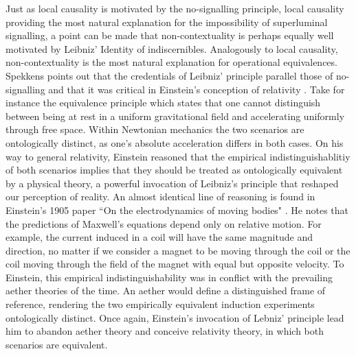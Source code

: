 Just as local causality is motivated by the no-signalling principle, local causality providing the most natural explanation for the impossibility of superluminal signalling, a point can be made that non-contextuality is perhaps equally well motivated by Leibniz' Identity of indiscernibles. Analogously to local causality, non-contextuality is the most natural explanation for operational equivalences. Spekkens points out that the credentials of Leibniz' principle parallel those of no-signalling and that it was critical in Einstein's conception of relativity \cite{Buchanan2019,Spekkens2019}. Take for instance the equivalence principle which states that one cannot distinguish between being at rest in a uniform gravitational field and accelerating uniformly through free space. Within Newtonian mechanics the two scenarios are ontologically distinct, as one's absolute acceleration differs in both cases. On his way to general relativity, Einstein reasoned that the empirical indistinguishablitiy of both scenarios implies that they should be treated as ontologically equivalent by a physical theory, a powerful invocation of Leibniz's principle that reshaped our perception of reality. An almost identical line of reasoning is found in Einstein’s 1905 paper ``On the electrodynamics of moving bodies" \cite{Einstein1905}. He notes that the predictions of Maxwell's equations depend only on relative motion. For example, the current induced in a coil will have the same magnitude and direction, no matter if we consider a magnet to be moving through the coil or the coil moving through the field of the magnet with equal but opposite velocity. To Einstein, this empirical indistinguishability was in conflict with the prevailing aether theories of the time. An aether would define a distinguished frame of reference, rendering the two empirically equivalent induction experiments ontologically distinct. Once again, Einstein's invocation of Lebniz' principle lead him to abandon aether theory and conceive relativity theory, in which both scenarios are equivalent.

